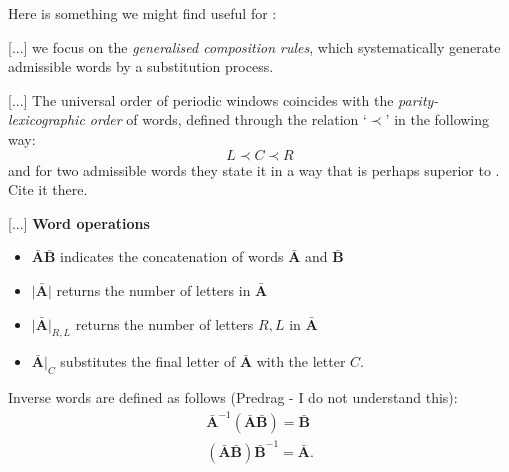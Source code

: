 Here is something we might find useful for \catlatt:

[...]
we focus on the \emph{generalised composition rules}, which systematically
generate admissible words by a substitution process.

[...]
The universal order of periodic windows coincides with the
\emph{parity-lexicographic order} of words, defined through the relation
`$\prec$' in the following way:
\[
L \prec C \prec R
\]
and for two admissible words they state it in a way that is perhaps
superior to                                         \toCB
{}. Cite it there.
\medskip

[...]
{\bf Word operations}
\begin{itemize}
\item $\bar{\mathbf{A}} \bar{\mathbf{B}}$ indicates the concatenation of words $\bar{\mathbf{A}}$ and $\bar{\mathbf{B}}$
\item $\lvert\bar{\mathbf{A}}\rvert$ returns the number of letters in $\bar{\mathbf{A}}$
\item $\lvert\bar{\mathbf{A}}\rvert_{R,L}$ returns the number of letters $R,L$ in $\bar{\mathbf{A}}$
\item $\bar{\mathbf{A}}\rvert_C$ substitutes the final letter of $\bar{\mathbf{A}}$ with the letter $C$.
\end{itemize}
%
Inverse words are defined as follows (Predrag - I do not understand this):
%
\begin{align}
\bar{\mathbf{A}}^{-1}\left(\bar{\mathbf{A}}\bar{\mathbf{B}}\right)=\bar{\mathbf{B}}\nonumber\\
\left(\bar{\mathbf{A}}\bar{\mathbf{B}}\right)\bar{\mathbf{B}}^{-1}=\bar{\mathbf{A}}.
\end{align}

